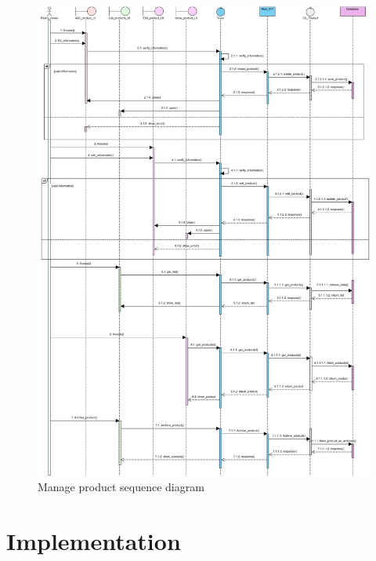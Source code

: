 \documentclass[12pt,a4paper]{report}
\begin{document}
\begin{figure}[H]
	\centering
	\includegraphics[width=6.7in,keepaspectratio]{manageproduct.jpg}
	\caption{Manage product sequence diagram}
	\label{product-sequence}
\end{figure}
\section{Implementation}
\end{document}
